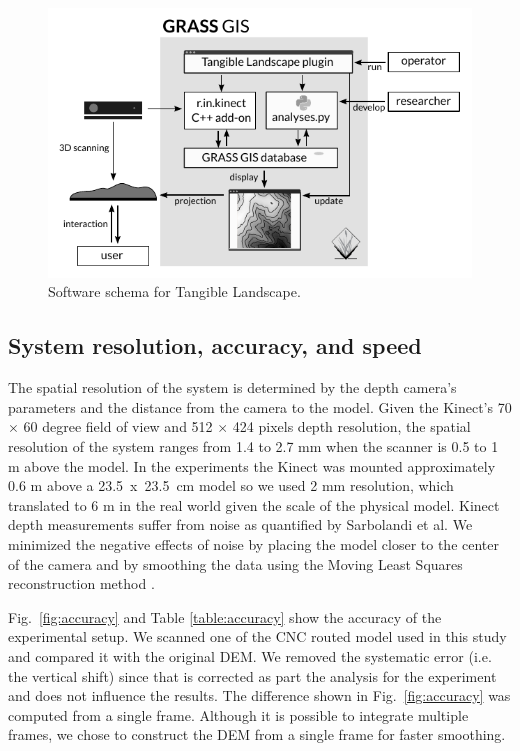 \documentclass[prodmode,acmtochi]{acmsmall} %
\begin{document}
\begin{figure}
\begin{center}
		\includegraphics{images/software-schema.pdf}
	\caption{Software schema for Tangible Landscape.}
	\label{fig:software_schema}
\end{center}
\end{figure}

\subsection{System resolution, accuracy, and speed}
The spatial resolution of the system 
is determined by the depth camera's parameters
and the distance from the camera to the model. 
Given the Kinect's 70 $\times$ 60 degree field of view
and 512 $\times$ 424 pixels depth resolution, 
the spatial resolution of the system ranges from 1.4 to 2.7 mm
when the scanner is 0.5 to 1 m above the model. 
%
In the experiments the Kinect was mounted 
approximately 0.6 m above a 23.5~x~23.5~cm model
so we used 2 mm resolution, which
translated to 6 m in the real world 
given the scale of the physical model.
Kinect depth measurements suffer from noise 
as quantified by Sarbolandi et al. \cite{Hamed2015}
We minimized the negative effects of noise 
by placing the model
closer to the center of the camera 
and by smoothing the data using the Moving Least
Squares reconstruction method \cite{Rusu2011}.

Fig.~\ref{fig:accuracy} and Table \ref{table:accuracy} 
show the accuracy of the experimental setup.
We scanned one of the CNC routed model used in this study
and compared it with the original DEM.
We removed the systematic error (i.e.~ the vertical shift) 
since that is corrected 
as part the analysis for the experiment
and does not influence the results.
The difference shown in Fig.~\ref{fig:accuracy} 
was computed from a single frame. 
Although it is possible to integrate multiple frames,
we chose to construct the DEM from a single frame 
for faster smoothing.
\end{document}
